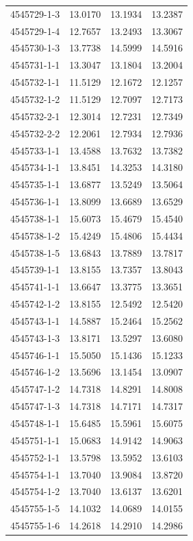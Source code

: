 \begin{longtable}{lrrr}
4545729-1-3 & 13.0170 & 13.1934 & 13.2387 \\
4545729-1-4 & 12.7657 & 13.2493 & 13.3067 \\
4545730-1-3 & 13.7738 & 14.5999 & 14.5916 \\
4545731-1-1 & 13.3047 & 13.1804 & 13.2004 \\
4545732-1-1 & 11.5129 & 12.1672 & 12.1257 \\
4545732-1-2 & 11.5129 & 12.7097 & 12.7173 \\
4545732-2-1 & 12.3014 & 12.7231 & 12.7349 \\
4545732-2-2 & 12.2061 & 12.7934 & 12.7936 \\
4545733-1-1 & 13.4588 & 13.7632 & 13.7382 \\
4545734-1-1 & 13.8451 & 14.3253 & 14.3180 \\
4545735-1-1 & 13.6877 & 13.5249 & 13.5064 \\
4545736-1-1 & 13.8099 & 13.6689 & 13.6529 \\
4545738-1-1 & 15.6073 & 15.4679 & 15.4540 \\
4545738-1-2 & 15.4249 & 15.4806 & 15.4434 \\
4545738-1-5 & 13.6843 & 13.7889 & 13.7817 \\
4545739-1-1 & 13.8155 & 13.7357 & 13.8043 \\
4545741-1-1 & 13.6647 & 13.3775 & 13.3651 \\
4545742-1-2 & 13.8155 & 12.5492 & 12.5420 \\
4545743-1-1 & 14.5887 & 15.2464 & 15.2562 \\
4545743-1-3 & 13.8171 & 13.5297 & 13.6080 \\
4545746-1-1 & 15.5050 & 15.1436 & 15.1233 \\
4545746-1-2 & 13.5696 & 13.1454 & 13.0907 \\
4545747-1-2 & 14.7318 & 14.8291 & 14.8008 \\
4545747-1-3 & 14.7318 & 14.7171 & 14.7317 \\
4545748-1-1 & 15.6485 & 15.5961 & 15.6075 \\
4545751-1-1 & 15.0683 & 14.9142 & 14.9063 \\
4545752-1-1 & 13.5798 & 13.5952 & 13.6103 \\
4545754-1-1 & 13.7040 & 13.9084 & 13.8720 \\
4545754-1-2 & 13.7040 & 13.6137 & 13.6201 \\
4545755-1-5 & 14.1032 & 14.0689 & 14.0155 \\
4545755-1-6 & 14.2618 & 14.2910 & 14.2986 \\

\end{longtable}
